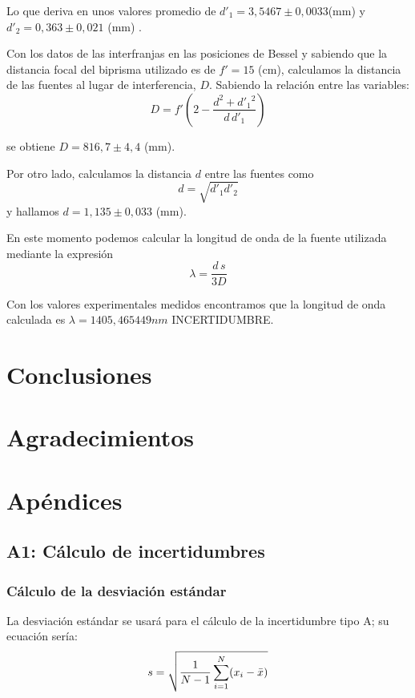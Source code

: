\documentclass[10pt,onecolumn]{article}
\begin{document}
Lo que deriva en unos valores promedio de $d'_1=3,5467\pm 0,0033$(mm) y $d'_2=0,363\pm 0,021$ (mm) .

Con los datos de las interfranjas en las posiciones de Bessel y sabiendo que la distancia focal del biprisma utilizado es de $f'=15$ (cm), calculamos la distancia de las fuentes al lugar de interferencia, $D$. 
Sabiendo la relación entre las variables:
\begin{equation}
D = f' \left( 2 - \frac{d^{2} + d'_{1}{}^{2}}{d\, d'_{1}} \right)
\end{equation}

se obtiene $D=816,7 \pm 4,4$ (mm).

Por otro lado, calculamos la distancia $d$ entre las fuentes como 
\begin{equation}
d = \sqrt{d'_{1} d'_{2}}
\end{equation}
y hallamos $d=1,135 \pm 0,033$ (mm).

En este momento podemos calcular la longitud de onda de la fuente utilizada mediante la expresión
\begin{equation}
\lambda = \frac{d \, s}{3D}
\end{equation}

Con los valores experimentales medidos encontramos que la longitud de onda calculada es $\lambda=1405,465449 nm$ INCERTIDUMBRE.





\section{Conclusiones}


\section{Agradecimientos}

\newpage
\section{Apéndices}
\subsection{A1: Cálculo de incertidumbres} 
\subsubsection{Cálculo de la desviación estándar}
La desviación estándar se usará para el cálculo de la incertidumbre tipo A; su ecuación sería:
\begin{equation}\centering
    s = \sqrt{\dfrac{1}{N - 1} \sum_{i=1}^{N} (x_i - \bar{x})}
\end{equation}
\end{document}

